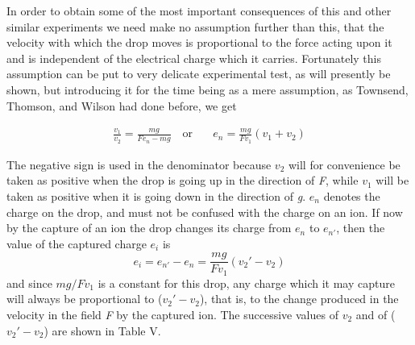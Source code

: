 In order to obtain some of the most important consequences of this and
other similar experiments we need make no assumption further than this,
that the velocity with which the drop moves is proportional to the force
acting upon it and is independent of the electrical charge which it
carries. Fortunately this assumption can be put to very delicate
experimental test, as will presently be shown, but introducing it for
the time being as a mere assumption, as Townsend, Thomson, and Wilson
had done before, we get
%
\begin{center}
\begin{align*}\tag{9}
\frac{v_1}{v_2} = \frac{mg}{Fe_n-mg} \quad\text{or}\quad & e_n = \frac{mg}{Fv_1}(v_1+v_2)
\end{align*}
\end{center}
%
The negative sign is used in the denominator because $v_2$ will for
convenience be taken as positive when the drop is going up in the
direction of \emph{F}, while $v_1$ will be taken as positive when it
is going down in the direction of \emph{g}. $e_n$ denotes the charge
on the drop, and must not be confused with the charge on an ion. If now
by the capture of an ion the drop changes its charge from $e_n$ to
$e_{n'}$, then the value of the captured charge $e_i$ is
\begin{equation*}\tag{10}
e_i = e_{n'}-e_n=\frac{mg}{Fv_1}(v_{2}'-v_2)
\end{equation*}
and since $mg/Fv_1$ is a constant for this drop, any charge which it
may capture will always be proportional to ($v_{2}'-v_2$),
that is, to the change produced in the velocity in the field \emph{F} by
the captured ion. The successive values of $v_2$ and of ($v_{2}'-v_2$) 
are shown in Table V.

